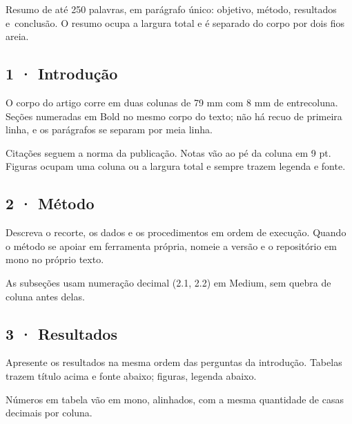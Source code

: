 \documentclass[artigo]{lina}
\begin{document}
\begin{resumo}
  Resumo de até 250 palavras, em parágrafo único: objetivo, método, resultados e~conclusão. O resumo ocupa a largura total e é separado do corpo por dois fios areia.
\end{resumo}
\begin{colunas}
\section{1 · Introdução}
O corpo do artigo corre em duas colunas de 79 mm com 8 mm de entrecoluna. Seções numeradas em Bold no mesmo corpo do texto; não há recuo de primeira linha, e os parágrafos se separam por meia linha.

\columnbreak
Citações seguem a norma da publicação. Notas vão ao pé da coluna em 9 pt. Figuras ocupam uma coluna ou a largura total e sempre trazem legenda e fonte.
\end{colunas}

\paginademo

\begin{colunas}
\section{2 · Método}
Descreva o recorte, os dados e os procedimentos em ordem de execução. Quando o método se apoiar em ferramenta própria, nomeie a versão e o repositório em mono no próprio texto.

As subseções usam numeração decimal (2.1, 2.2) em Medium, sem quebra de coluna antes delas.
\end{colunas}

\figuramarcadora[260]

\begin{colunas}
\section{3 · Resultados}
Apresente os resultados na mesma ordem das perguntas da introdução. Tabelas trazem título acima e fonte abaixo; figuras, legenda abaixo.

\columnbreak
Números em tabela vão em mono, alinhados, com a mesma quantidade de casas decimais por coluna.
\end{colunas}
\end{document}
